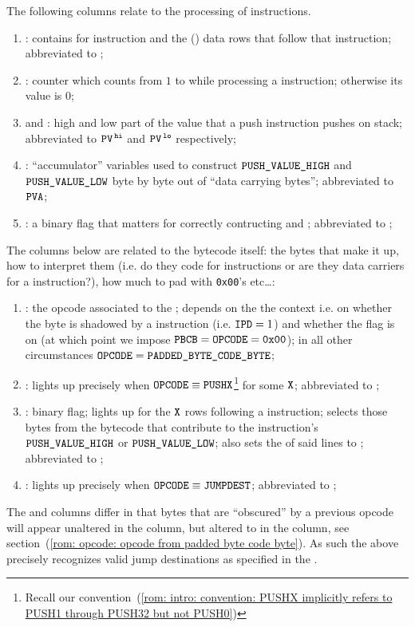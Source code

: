 The following columns relate to the processing of  instructions.
\begin{enumerate}[resume]
    \item \PP{}:
	contains  for  instruction and the () data rows that follow that instruction;
	abbreviated to \pp{};
    \item \CP{}:
	counter which counts from $1$ to \PP{} while processing a  instruction;
	otherwise its value is $0$;
    \item \PV\HIGH{} and \PV\LOW{}:
	high and low part of the value that a push instruction pushes on stack;
	abbreviated to $\texttt{PV}^{\mathtt{\,hi}}$ and $\texttt{PV}^{\mathtt{\,lo}}$ respectively;
    \item \PVA:
	``accumulator'' variables used to construct $\texttt{PUSH\_VALUE}\texttt{\_HIGH}$ and $\texttt{PUSH\_VALUE}\texttt{\_LOW}$ byte by byte out of ``data carrying bytes'';
	abbreviated to $\texttt{PVA}$;
    \item \PFB{}:
	a binary flag that matters for correctly contructing \PV\HIGH{} and \PV\LOW{};
	abbreviated to \pfb{};
\end{enumerate}

The columns below are related to the bytecode itself: the bytes that make it up, how to interpret them (i.e. do they code for instructions or are they data carriers for a  instruction?), how much to pad with \texttt{0x00}'s etc\dots:
\begin{enumerate}[resume]
    \item \opc{}:
	the opcode associated to the \pbcb{};
	depends on the the context i.e. on whether the byte is shadowed by a  instruction (i.e. \( \texttt{IPD}{}=1 \)) and whether the \CSR{} flag is on (at which point we impose $\texttt{PBCB}=\texttt{OPCODE}=\texttt{0x00}$);
	in all other circumstances \( \texttt{OPCODE}{} = \texttt{PADDED\_BYTE\_CODE\_BYTE}{} \);
    \item \IP{}:
	lights up precisely when
	$\texttt{OPCODE} \equiv \texttt{PUSHX}$\footnote{Recall our convention~(\ref{rom: intro: convention: PUSHX implicitly refers to PUSH1 through PUSH32 but not PUSH0})}
	for some $\texttt{X}$;
	abbreviated to \ip{};
    \item \IPD{}:
	binary flag;
	lights up for the $\texttt{X}$ rows following a  instruction;
	selects those bytes from the bytecode that contribute to the  instruction's $\texttt{PUSH\_VALUE}\texttt{\_HIGH}$ or $\texttt{PUSH\_VALUE}\texttt{\_LOW}$;
	also sets the \opc{} of said lines to ;
	abbreviated to \ipd{};
    \item \ISVALIDJUMPDESTINATION{}:
	lights up precisely when $\texttt{OPCODE} \equiv \texttt{JUMPDEST}$;
	abbreviated to \isValidJumpDestination{};
\end{enumerate}
\saNote{}
The \opc{} and \pbcb{} columns differ in that bytes that are ``obscured'' by a previous  opcode
will appear unaltered in the \pbcb{} column, but altered to  in the \opc{} column, see section~(\ref{rom: opcode: opcode from padded byte code byte}).
As such the above precisely recognizes valid jump destinations as specified in the \cite{EYP-London}.


